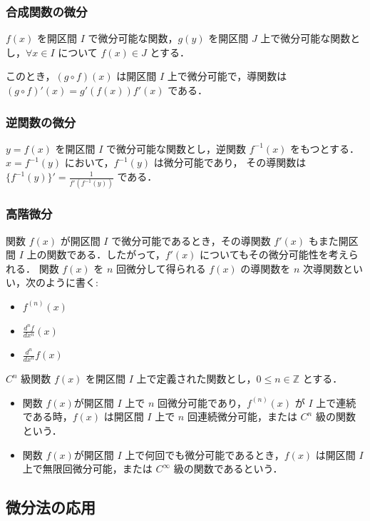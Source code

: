 \documentclass[xelatex,ja=standard,jafont=noto]{bxjsarticle}
\begin{document}
  \subsubsection{合成関数の微分}
  \begin{theorem}{}{}
    $f(x)$ を開区間 $I$ で微分可能な関数，$g(y)$ を開区間 $J$ 上で微分可能な関数とし，$\forall x \in I$ について $f(x) \in J$ とする．
    
    このとき，$(g \circ f)(x)$ は開区間 $I$ 上で微分可能で，導関数は $(g \circ f)'(x) = g'(f(x))f'(x)$  である．
  \end{theorem}
  \subsubsection{逆関数の微分}
  \begin{theorem}{}{}
    $y = f(x)$ を開区間 $I$ で微分可能な関数とし，逆関数 $f^{-1}(x)$ をもつとする． $x = f^{-1}(y)$ において，$f^{-1}(y)$ は微分可能であり，
    その導関数は $\{f^{-1}(y)\}' = \frac{1}{f'(f^{-1}(y))}$ である．
  \end{theorem}
  \subsubsection{高階微分}
  \begin{tcb}{}{}
    関数 $f(x)$ が開区間 $I$ で微分可能であるとき，その導関数 $f'(x)$ もまた開区間 $I$ 上の関数である．したがって，$f'(x)$ についてもその微分可能性を考えられる．
    関数 $f(x)$ を $n$ 回微分して得られる $f(x)$ の導関数を $n$ 次導関数といい，次のように書く: 
    \begin{itemize}
      \item $f^{(n)}(x)$ 
      \item $\frac{d^n f}{d x^n}(x)$
      \item $\frac{d^n}{d x^n}f(x)$
    \end{itemize}  
  \end{tcb}
  
  \begin{tcb}{$C^n$ 級関数}{}
    $f(x)$ を開区間 $I$ 上で定義された関数とし，$0 \leq n \in \mathbb{Z}$ とする．
    \begin{itemize}
      \item 関数 $f(x)$が開区間 $I$ 上で $n$ 回微分可能であり，$f^{(n)}(x)$ が $I$ 上で連続である時，$f(x)$ は開区間 $I$ 上で $n$ 回連続微分可能，または $C^n$ 級の関数という．
      \item 関数 $f(x)$が開区間 $I$ 上で何回でも微分可能であるとき，$f(x)$ は開区間 $I$ 上で無限回微分可能，または $C^{\infty}$ 級の関数であるという．
    \end{itemize}
  \end{tcb}
  
  \subsection{微分法の応用}
\end{document}
